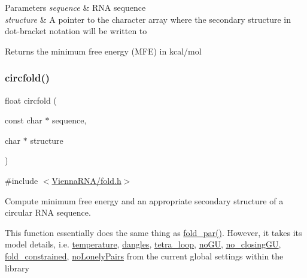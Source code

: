 \begin{DoxyParams}{Parameters}
{\em sequence} & R\+NA sequence \\
\hline
{\em structure} & A pointer to the character array where the secondary structure in dot-\/bracket notation will be written to \\
\hline
\end{DoxyParams}
\begin{DoxyReturn}{Returns}
the minimum free energy (M\+FE) in kcal/mol 
\end{DoxyReturn}
\mbox{\label{group__mfe__fold__single_ga4ac63ab3e8d9a80ced28b8052d94e423}} 
\subsubsection{\texorpdfstring{circfold()}{circfold()}}
{\footnotesize\ttfamily float circfold (\begin{DoxyParamCaption}\item[{const char $\ast$}]{sequence,  }\item[{char $\ast$}]{structure }\end{DoxyParamCaption})}



{\ttfamily \#include $<$\hyperlink{fold_8h}{Vienna\+R\+N\+A/fold.\+h}$>$}



Compute minimum free energy and an appropriate secondary structure of a circular R\+NA sequence. 

This function essentially does the same thing as \hyperlink{group__mfe__fold__single_ga2bc41df5d71fee6fd8da9904ee65d8fb}{fold\+\_\+par()}. However, it takes its model details, i.\+e. \hyperlink{group__model__details_gab4b11c8d9c758430960896bc3fe82ead}{temperature}, \hyperlink{group__model__details_ga72b511ed1201f7e23ec437e468790d74}{dangles}, \hyperlink{group__model__details_ga4f6265bdf0ead7ff4628a360adbfd77e}{tetra\+\_\+loop}, \hyperlink{group__model__details_gabf380d09e4f1ab94fc6af57cf0ad5d32}{no\+GU}, \hyperlink{group__model__details_gaa8d1c7b92489179e1eafa562b7bdd259}{no\+\_\+closing\+GU}, \hyperlink{fold__vars_8h_a0afc287c2464866d94858c39175154af}{fold\+\_\+constrained}, \hyperlink{group__model__details_ga097eccaabd6ae8b4fef83cccff85bb5d}{no\+Lonely\+Pairs} from the current global settings within the library

